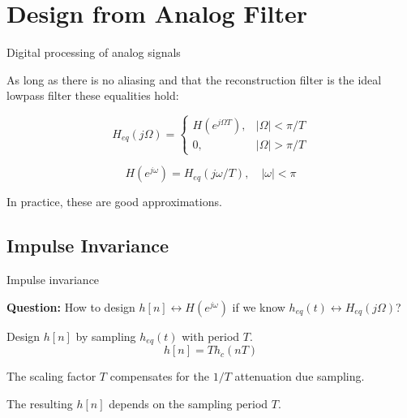 \documentclass[10pt, handout]{beamer}
\begin{document}
\section{Design from Analog Filter}
\begin{frame}{Digital processing of analog signals}
\begin{center}
	\def\Heff{1}
	\resizebox{\linewidth}{!}{}
\end{center}

As long as there is no aliasing and that the reconstruction filter is the ideal lowpass filter these equalities hold:

\begin{equation}
H_{eq}(j\Omega) = \begin{cases}
H(e^{j\Omega T}), & |\Omega| < \pi/T \\
0, & |\Omega| > \pi/T
\end{cases} \tag{from DSP to analog}
\end{equation}

\begin{equation}
H(e^{j\omega}) = H_{eq}(j\omega/T), \quad|\omega| < \pi  \tag{from analog to DSP}
\end{equation}

In practice, these are good approximations.
\end{frame}

\subsection{Impulse Invariance}
\begin{frame}{Impulse invariance}

\textbf{Question:} How to design $h[n] \longleftrightarrow H(e^{j\omega})$ if we know $h_{eq}(t) \longleftrightarrow H_{eq}(j\Omega)$?

\begin{center}
	\def\Heff{1}
	\resizebox{\linewidth}{!}{}
\end{center}

Design $h[n]$ by sampling $h_{eq}(t)$ with period $T$.
\begin{equation}
	h[n] = Th_c(nT) \tag{impulse invariance}
\end{equation}

The scaling factor $T$ compensates for the $1/T$ attenuation due sampling.

The resulting $h[n]$ depends on the sampling period $T$.

\end{frame}
\end{document}

